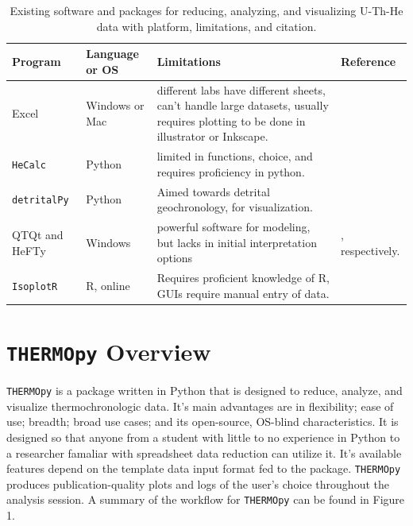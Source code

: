 \documentclass[12pt]{article}
\begin{document}
\begin{table}[h!]
    \centering
    \begin{longtable}{p{3cm} p{3cm} p{5cm} p{4cm}}
        Program & Language or OS & Limitations & Reference \\ \hline
        Excel & Windows or Mac & different labs have different sheets, can’t handle large datasets, usually requires plotting to be done in illustrator or Inkscape. &&\\ 
        \texttt{HeCalc} & Python & limited in functions, choice, and requires proficiency in python. & \cite{martinetal2023} \\
        \texttt{detritalPy} & Python & Aimed towards detrital geochronology, for visualization. & \cite{sharmanetal2018} \\
        QTQt and HeFTy & Windows & powerful software for modeling, but lacks in initial interpretation options & \cite{gallagher2012, ketcham2005}, respectively. \\

        \texttt{IsoplotR} & R, online & Requires proficient knowledge of R, GUIs require manual entry of data. & \cite{vermeesch2018}
    \end{longtable}
       
  
    \caption{Existing software and packages for reducing, analyzing, and visualizing U-Th-He data with platform, limitations, and citation.}
    \label{tab:my_label}
\end{table}


\section{\texttt{THERMOpy} Overview}
\texttt{THERMOpy} is a package written in Python that is designed to reduce, analyze, and visualize thermochronologic data. It's main advantages are in flexibility; ease of use; breadth; broad use cases; and its open-source, OS-blind characteristics. It is designed so that anyone from a student with little to no experience in Python to a researcher famaliar with spreadsheet data reduction can utilize it. It's available features depend on the template data input format fed to the package. \texttt{THERMOpy} produces publication-quality plots and logs of the user's choice throughout the analysis session. A summary of the workflow for  \texttt{THERMOpy} can be found in Figure 1.
\end{document}

